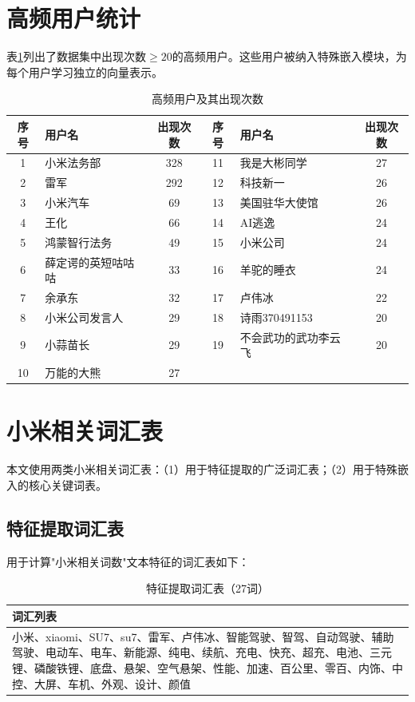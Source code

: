 \documentclass[10pt]{article}
\begin{document}
\newpage
\appendix

\section{高频用户统计}
\label{appendix:vip_users}

表\ref{tab:vip_users}列出了数据集中出现次数$\geq 20$的高频用户。这些用户被纳入特殊嵌入模块，为每个用户学习独立的向量表示。

\begin{table}[H]
\centering
\caption{高频用户及其出现次数}
\label{tab:vip_users}
\begin{tabular}{clc|clc}
\toprule
\textbf{序号} & \textbf{用户名} & \textbf{出现次数} & \textbf{序号} & \textbf{用户名} & \textbf{出现次数} \\
\midrule
1 & 小米法务部 & 328 & 11 & 我是大彬同学 & 27 \\
2 & 雷军 & 292 & 12 & 科技新一 & 26 \\
3 & 小米汽车 & 69 & 13 & 美国驻华大使馆 & 26 \\
4 & 王化 & 66 & 14 & AI逃逸 & 24 \\
5 & 鸿蒙智行法务 & 49 & 15 & 小米公司 & 24 \\
6 & 薛定谔的英短咕咕咕 & 33 & 16 & 羊驼的睡衣 & 24 \\
7 & 余承东 & 32 & 17 & 卢伟冰 & 22 \\
8 & 小米公司发言人 & 29 & 18 & 诗雨370491153 & 20 \\
9 & 小蒜苗长 & 29 & 19 & 不会武功的武功李云飞 & 20 \\
10 & 万能的大熊 & 27 & & & \\
\bottomrule
\end{tabular}
\end{table}

\section{小米相关词汇表}
\label{appendix:xiaomi_keywords}

本文使用两类小米相关词汇表：（1）用于特征提取的广泛词汇表；（2）用于特殊嵌入的核心关键词表。

\subsection{特征提取词汇表}

用于计算"小米相关词数"文本特征的词汇表如下：

\begin{table}[H]
\centering
\caption{特征提取词汇表（27词）}
\label{tab:feature_keywords}
\begin{tabular}{p{12cm}}
\toprule
\textbf{词汇列表} \\
\midrule
小米、xiaomi、SU7、su7、雷军、卢伟冰、智能驾驶、智驾、自动驾驶、辅助驾驶、电动车、电车、新能源、纯电、续航、充电、快充、超充、电池、三元锂、磷酸铁锂、底盘、悬架、空气悬架、性能、加速、百公里、零百、内饰、中控、大屏、车机、外观、设计、颜值 \\
\bottomrule
\end{tabular}
\end{table}
\end{document}
